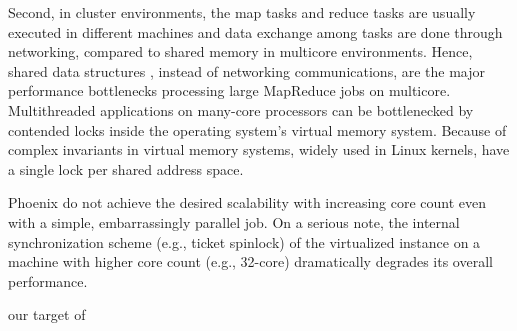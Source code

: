 Second, in cluster environments, 
the map tasks and reduce tasks are usually 
executed in different machines and data exchange among
tasks are done through networking, 
compared to shared memory in multicore environments. 
Hence, shared data structures , 
instead of networking communications, 
are the major performance bottlenecks processing large MapReduce jobs on multicore.
Multithreaded applications on many-core processors can be
bottlenecked by contended locks inside the operating system’s
virtual memory system. 
Because of complex invariants in virtual memory systems, 
widely used in Linux kernels, 
have a single lock per shared address space. 
\cite{clements2013radixvm}


Phoenix do not achieve the desired scalability with increasing core count 
even with a simple, embarrassingly parallel job.
On a serious note, the internal
synchronization scheme (e.g., ticket spinlock) of
the virtualized instance on a machine with higher core count (e.g.,
32-core) dramatically degrades its overall performance.

{\color{red}our target of \myds}



